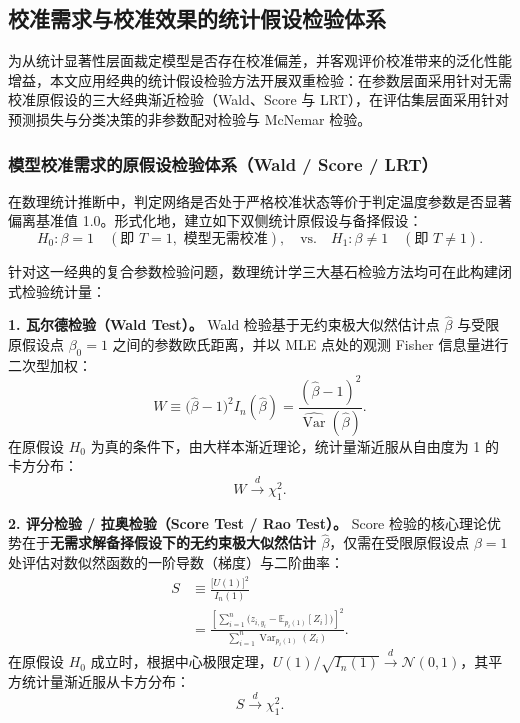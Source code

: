 \subsection{校准需求与校准效果的统计假设检验体系}

为从统计显著性层面裁定模型是否存在校准偏差，并客观评价校准带来的泛化性能增益，本文应用经典的统计假设检验方法开展双重检验：在参数层面采用针对无需校准原假设的三大经典渐近检验（Wald、Score 与 LRT），在评估集层面采用针对预测损失与分类决策的非参数配对检验与 McNemar 检验。

\subsubsection{模型校准需求的原假设检验体系（Wald / Score / LRT）}

在数理统计推断中，判定网络是否处于严格校准状态等价于判定温度参数是否显著偏离基准值 1.0。形式化地，建立如下双侧统计原假设与备择假设：
\begin{equation}\label{eq:null_hypothesis}
H_0: \beta = 1 \quad (\text{即 } T = 1, \text{ 模型无需校准}), \quad \text{vs.} \quad H_1: \beta \ne 1 \quad (\text{即 } T \ne 1).
\end{equation}

针对这一经典的复合参数检验问题，数理统计学三大基石检验方法均可在此构建闭式检验统计量：

\textbf{1. 瓦尔德检验（Wald Test）。}
Wald 检验基于无约束极大似然估计点 $\hat\beta$ 与受限原假设点 $\beta_0=1$ 之间的参数欧氏距离，并以 MLE 点处的观测 Fisher 信息量进行二次型加权：
\begin{equation}\label{eq:wald_test_stat}
W \equiv \big(\hat\beta - 1\big)^2 I_n(\hat\beta) = \frac{(\hat\beta - 1)^2}{\widehat{\operatorname{Var}}(\hat\beta)}.
\end{equation}
在原假设 $H_0$ 为真的条件下，由大样本渐近理论，统计量渐近服从自由度为 1 的卡方分布：
\begin{equation}\label{eq:wald_distribution}
W \xrightarrow{d} \chi^2_1.
\end{equation}

\textbf{2. 评分检验 / 拉奥检验（Score Test / Rao Test）。}
Score 检验的核心理论优势在于\textbf{无需求解备择假设下的无约束极大似然估计 $\hat\beta$}，仅需在受限原假设点 $\beta=1$ 处评估对数似然函数的一阶导数（梯度）与二阶曲率：
\begin{equation}\label{eq:score_test_stat}
\begin{split}
S &\equiv \frac{\big[U(1)\big]^2}{I_n(1)} \\
&= \frac{\left[ \sum_{i=1}^n \big( z_{i, y_i} - \mathbb{E}_{p_i(1)}[Z_i] \big) \right]^2}{\sum_{i=1}^n \operatorname{Var}_{p_i(1)}(Z_i)}.
\end{split}
\end{equation}
在原假设 $H_0$ 成立时，根据中心极限定理，$U(1)/\sqrt{I_n(1)} \xrightarrow{d} \mathcal{N}(0, 1)$，其平方统计量渐近服从卡方分布：
\begin{equation}\label{eq:score_distribution}
S \xrightarrow{d} \chi^2_1.
\end{equation}

